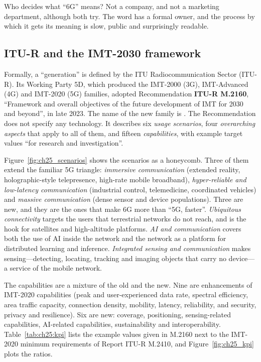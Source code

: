 Who decides what ``6G'' means? Not a company, and not a marketing department, although both try.
The word has a formal owner, and the process by which it gets its meaning is slow, public and
surprisingly readable.

\subsection{ITU-R and the IMT-2030 framework}

Formally, a ``generation'' is defined by the ITU Radiocommunication Sector (ITU-R). Its Working
Party 5D, which produced the IMT-2000 (3G), IMT-Advanced (4G) and IMT-2020 (5G) families, adopted
Recommendation \textbf{ITU-R M.2160}, ``Framework and overall objectives of the future development of
IMT for 2030 and beyond'', in late 2023. The name of the new family is . The
Recommendation does not specify any technology. It describes six \emph{usage scenarios}, four
\emph{overarching aspects} that apply to all of them, and fifteen \emph{capabilities}, with example
target values ``for research and investigation''.

Figure~\ref{fig:ch25_scenarios} shows the scenarios as a honeycomb. Three of them extend the familiar
5G triangle: \emph{immersive communication} (extended reality, holographic-style telepresence,
high-rate mobile broadband), \emph{hyper-reliable and low-latency communication} (industrial control,
telemedicine, coordinated vehicles) and \emph{massive communication} (dense sensor and device
populations). Three are new, and they are the ones that make 6G more than ``5G, faster''.
\emph{Ubiquitous connectivity} targets the users that terrestrial networks do not reach, and is the
hook for satellites and high-altitude platforms. \emph{AI and communication} covers both the use of
AI inside the network and the network as a platform for distributed learning and inference.
\emph{Integrated sensing and communication} makes sensing---detecting, locating, tracking and imaging
objects that carry no device---a service of the mobile network.

The capabilities are a mixture of the old and the new. Nine are enhancements of IMT-2020 capabilities
(peak and user-experienced data rate, spectral efficiency, area traffic capacity, connection density,
mobility, latency, reliability, and security, privacy and resilience). Six are new: coverage,
positioning, sensing-related capabilities, AI-related capabilities, sustainability and
interoperability. Table~\ref{tab:ch25:kpi} lists the example values given in M.2160 next to the
IMT-2020 minimum requirements of Report ITU-R M.2410, and Figure~\ref{fig:ch25_kpi} plots the
ratios.

